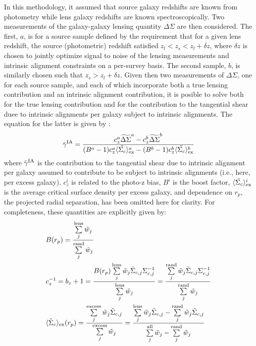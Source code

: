 \documentclass[a4paper,fleqn,usenatbib,useAMS]{mnras}
\begin{document}
In this methodology, it assumed that source galaxy redshifts are known from photometry while lens galaxy redshifts are known spectroscopically. Two measurements of the galaxy-galaxy lensing quantity $\Delta \Sigma$ are then considered. The first, $a$, is for a source sample defined by the requirement that for a given lens redshift, the source (photometric) redshift satisfied $z_l < z_s < z_l + \delta z$, where $\delta z$ is chosen to jointly optimize signal to noise of the lensing measurements and intrinsic alignment constraints on a per-survey basis. The second sample, $b$, is similarly chosen such that $z_s > z_l + \delta z$. Given then two measurements of $\Delta \Sigma$, one for each source sample, and each of which incorporate both a true lensing contribution and an intrinsic alignment contribution, it is posible to solve both for the true lensing contribution and for the contribution to the tangential shear duee to intrinsic alignments per galaxy subject to intrinsic alignments. The equation for the latter is given by \cite{Blazek2012}:
\begin{equation}
\bar{\gamma}^{\rm IA} = \frac{c_z^a \widetilde{\Delta\Sigma}^a - c_z^b \widetilde{\Delta\Sigma}^b}{(B^a-1)c_z^a \langle \tilde{\Sigma_c}\rangle_{\rm ex}^a -(B^b-1)c_z^b \langle \tilde{\Sigma_c}\rangle_{\rm ex}^b}
\label{gammaIA_Blazek}
\end{equation}
where $\bar{\gamma}^{\rm IA}$ is the contribution to the tangential shear due to intrinsic alignment per galaxy assumed to contribute to be subject to intrinsic alignments (i.e., here, per excess galaxy). $c_z^i$ is related to the photo-z bias, $B^i$ is the boost factor, $\langle \tilde{\Sigma_c}\rangle_{\rm ex}^i$ is the average critical surface density per excess galaxy, and dependence on $r_p$, the projected radial separation, has been omitted here for clarity. For completeness, these quantities are explicitly given by:
\begin{align}
&B(r_p) = \frac{\sum\limits_{j}^{\rm lens}\tilde{w}_j}{\sum\limits_{j}^{\rm rand} \tilde{w}_j} \label{boost} \\
&c_z^{-1} = b_z+1 = \frac{B(r_p) \sum\limits^{\rm lens}_{j} \tilde{w}_j \tilde{\Sigma}_{c,j} \Sigma_{c,j}^{-1}}{\sum\limits^{\rm lens}_{j} \tilde{w}_j} = \frac{\sum\limits^{\rm rand}_{j} \tilde{w}_j \tilde{\Sigma}_{c,j} \Sigma_{c,j}^{-1}}{\sum\limits^{\rm rand}_{j} \tilde{w}_j} \label{photozbias} \\
&\langle \tilde{\Sigma}_c\rangle_{\rm ex} (r_p) =  \frac{\sum\limits_{j}^{\rm excess} \tilde{w}_j \tilde{\Sigma}_{c,j}}{\sum\limits_{j}^{\rm excess} \tilde{w}_j} = \frac{\sum\limits_{j}^{\rm lens} \tilde{w}_j \tilde{\Sigma}_{c,j}- \sum\limits_{j}^{\rm rand} \tilde{w}_j \tilde{\Sigma}_{c,j}}{\sum\limits_{j}^{\rm all} \tilde{w}_j - \sum\limits_{j}^{\rm rand} \tilde{w}_j}\label{Sigmaex}
\end{align}
\end{document}

